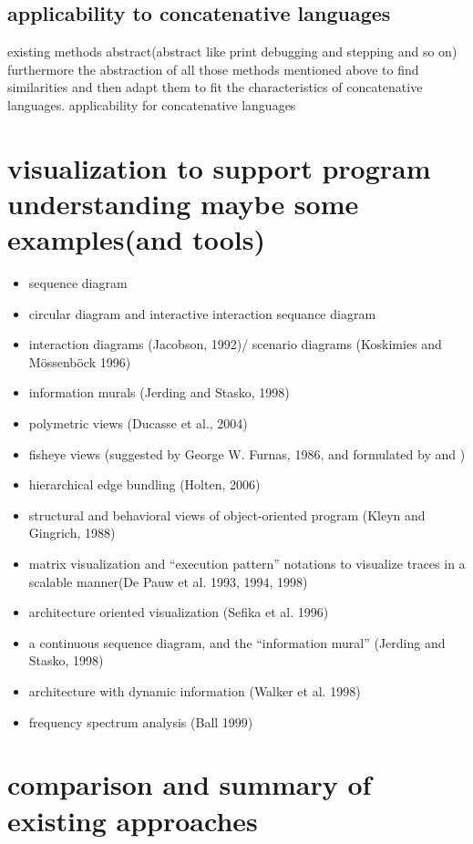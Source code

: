 \begin{itemize}
\subsection{applicability to concatenative languages}

existing methods abstract(abstract like print debugging and stepping and so on) furthermore the abstraction of all those methods mentioned above to find similarities and then adapt them to fit the characteristics of concatenative languages.
applicability for concatenative languages

\section{visualization to support program understanding maybe some examples(and tools)}

\begin{itemize}
\item sequence diagram
\item circular diagram and interactive interaction sequance diagram \cite{Cornelissen2009}
\item interaction diagrams (Jacobson, 1992)/ scenario diagrams (Koskimies and Mössenböck 1996)
\item information murals (Jerding and Stasko, 1998)
\item polymetric views (Ducasse et al., 2004)
\item fisheye views (suggested by George W. Furnas, 1986, and formulated by \cite{Storey:1995:GLA:647547.728600} and \cite{Sarkar:1994:GFV:198366.198384})
\item hierarchical edge bundling (Holten, 2006)
\item structural and behavioral views of object-oriented program (Kleyn and Gingrich, 1988)
\item matrix visualization and “execution pattern” notations \cite{Pauw98executionpatterns} to visualize traces in a scalable manner(De Pauw et al. 1993, 1994, 1998) 
\item architecture oriented visualization (Sefika et al. 1996)
\item a continuous sequence diagram, and the “information mural” (Jerding and Stasko, 1998)
\item architecture with dynamic information (Walker et al. 1998)
\item frequency spectrum analysis (Ball 1999)
\end{itemize}

\section{comparison and summary of existing approaches}


\end{itemize}
